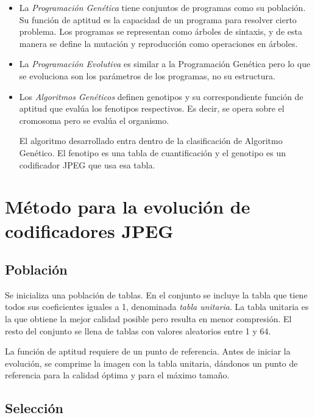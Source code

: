 \begin{itemize}
\item La \emph{Programación Genética} \cite{GenProg} tiene conjuntos de
programas como su población. Su función de aptitud es la capacidad de un
programa para resolver cierto problema. Los programas se representan como
árboles de sintaxis, y de esta manera se define la mutación y reproducción como
operaciones en árboles.
\item La \emph{Programación Evolutiva} es similar a la Programación Genética
pero lo que se evoluciona son los parámetros de los programas, no su
estructura.
\item Los \emph{Algoritmos Genéticos} definen genotipos y su correspondiente
función de aptitud que evalúa los fenotipos respectivos. Es decir, se opera
sobre el cromosoma pero se evalúa el organismo.

El algoritmo desarrollado entra dentro de la clasificación de Algoritmo
Genético. El fenotipo es una tabla de cuantificación y el genotipo es un
codificador \gls{JPEG} que usa esa tabla.

\end{itemize}

\section{Método para la evolución de codificadores JPEG}

\subsection{Población}

Se inicializa una población de tablas. En el conjunto se incluye la tabla que
tiene todos sus coeficientes iguales a 1, denominada \emph{\gls{tabla
unitaria}}. La tabla unitaria es la que obtiene la mejor calidad posible pero
resulta en menor compresión. El resto del conjunto se llena de tablas con
valores aleatorios entre 1 y 64.

La función de aptitud requiere de un punto de referencia. Antes de iniciar la
evolución, se comprime la imagen con la tabla unitaria, dándonos un punto de
referencia para la calidad óptima y para el máximo tamaño.

\subsection{Selección}

